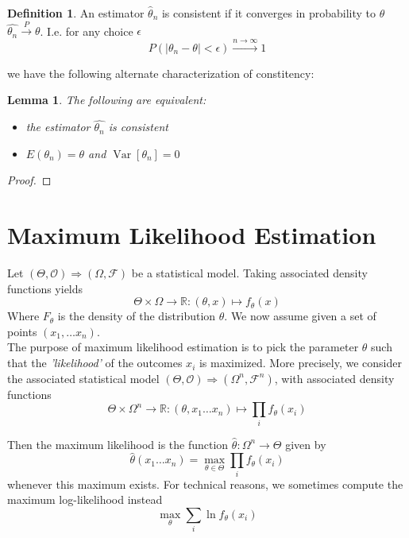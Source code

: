 \documentclass{book}
\theoremstyle{plain}
\newtheorem{lemma}[corollary]{Lemma}
\theoremstyle{definition}
\newtheorem{definition}[corollary]{Definition}
\renewcommand{\d}[1]{\mathbb{#1}}
\newcommand{\fun}{\mapsto}
\newcommand{\mor}{\longrightarrow}
\renewcommand{\r}[1]{\mathcal{#1}}
\renewcommand{\r}[1]{\mathcal{#1}}
\DeclareMathOperator{\Var}{Var}
\begin{document}
\begin{definition}
An estimator $\hat{\theta}_n$ is consistent if it converges in probability to $\theta$ $\hat{\theta_n}\stackrel{P}{\mor} \theta$. I.e. for any choice $\epsilon$
\[
P(\vert \theta_n-\theta\vert <\epsilon)\stackrel{n\to \infty}{\mor} 1
\]
\end{definition}

we have the following alternate characterization of constitency:

\begin{lemma}
The following are equivalent:
\begin{itemize}
\item the estimator $\hat{\theta_n}$ is consistent
\item $E(\theta_n)=\theta$ and $\Var[\theta_n]=0$	
\end{itemize}
\end{lemma}

\begin{proof}
	
\end{proof}
 
 
\section{Maximum Likelihood Estimation}
Let $(\Theta, \r{O})\Longrightarrow (\Omega, \r{F})$ be a statistical model. Taking associated density functions yields
\[
\Theta\times \Omega \mor \d{R}:(\theta,x)\fun f_\theta(x)
\]
Where $F_\theta$ is the density of the distribution $\theta$. We now assume given a set of points $(x_1,\ldots x_n)$.\\ The purpose of maximum likelihood estimation is to pick the parameter $\theta$ such that the \emph{'likelihood'} of the outcomes $x_i$ is maximized. More precisely, we consider the associated statistical model $(\Theta,\r{O})\Longrightarrow (\Omega^n,\r{F}^n)$, with associated density functions
\[
\Theta\times \Omega^n\mor \d{R}:(\theta,x_1\ldots x_n)\fun \prod_i f_\theta(x_i)
\]


Then the maximum likelihood is the function $\hat{\theta}:\Omega^n\mor \Theta$ given by
\[
\hat{\theta}(x_1\ldots x_n)=\max_{\theta\in \Theta} \prod_i f_\theta(x_i)
\]
whenever this maximum exists. For technical reasons, we sometimes compute the maximum  log-likelihood instead
\[
\max_\theta \sum_i \ln f_\theta(x_i)
\]
\end{document}
